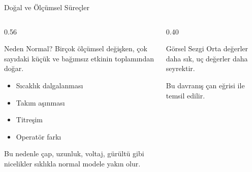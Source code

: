 \documentclass[light]{lutbeamer}
\begin{document}
\begin{frame}{Doğal ve Ölçümsel Süreçler}
\small
\begin{columns}[T,onlytextwidth]
    \begin{column}{0.56\textwidth}
        \begin{block}{Neden Normal?}
            Birçok ölçümsel değişken, çok sayıdaki küçük ve bağımsız etkinin toplamından doğar.
        \end{block}

        \begin{itemize}
            \item Sıcaklık dalgalanması
            \item Takım aşınması
            \item Titreşim
            \item Operatör farkı
        \end{itemize}

        Bu nedenle çap, uzunluk, voltaj, gürültü gibi nicelikler sıklıkla normal modele yakın olur.
    \end{column}
    \begin{column}{0.40\textwidth}
        \begin{exampleblock}{Görsel Sezgi}
            Orta değerler daha sık, uç değerler daha seyrektir.

            \vspace{0.15cm}
            Bu davranış çan eğrisi ile temsil edilir.
        \end{exampleblock}
    \end{column}
\end{columns}
\end{frame}
\end{document}
